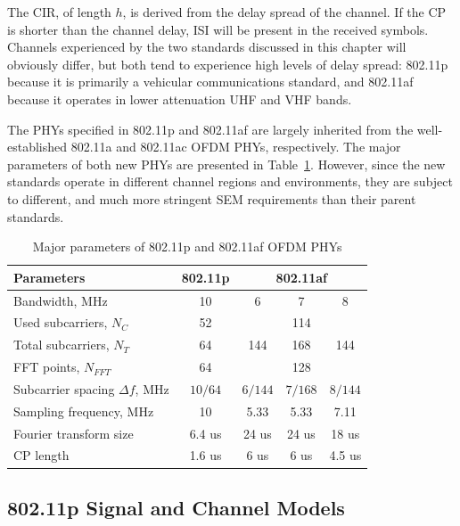 The CIR, of length $h$, is derived from the delay spread of the channel.
If the CP is shorter than the channel delay, ISI will be present in the received symbols.
Channels experienced by the two standards discussed in this chapter will obviously differ, but both tend to experience high levels of delay spread: 802.11p because it is primarily a vehicular communications standard, and 802.11af because it operates in lower attenuation UHF and VHF bands.


The PHYs specified in 802.11p and 802.11af are largely inherited from the well-established 802.11a and 802.11ac OFDM PHYs, respectively.
The major parameters of both new PHYs are presented in Table~\ref{tab:Para}.
However, since the new standards operate in different channel regions and environments, they are subject to different, and much more stringent SEM requirements than their parent standards.
\begin{table}[h]
	\centering
	\caption{ Major parameters of 802.11p and 802.11af OFDM PHYs}
	\label{tab:Para}
	\renewcommand{\arraystretch}{1.2}
	\begin{tabular}{l|c|c|c|c}
		Parameters                      	 		& 802.11p & \multicolumn{3}{c}{802.11af} \\ \hline
		Bandwidth, MHz                  		& 10     & 6    & 7   & 8    \\ \hline
		Used subcarriers, $N_{C}$ 		& 52      & \multicolumn{3}{c}{114}      \\ \hline
		Total subcarriers, $N_{T}$  		& 64      & 144      & 168     & 144     \\ \hline
		FFT points, $N_{FFT}$      		& 64      & \multicolumn{3}{c}{128}      \\ \hline
		Subcarrier spacing $\Delta f$, MHz        	& ${10}/{64}$   & ${6}/{144}$    & ${7}/{168}$   & ${8}/{144}$   \\ \hline
		Sampling frequency, MHz			& 10 & 5.33 & 5.33 & 7.11  \\ \hline
		Fourier transform size         		& 6.4 us  & 24 us    & 24 us   & 18 us   \\ \hline
		CP length                        			& 1.6 us  & 6 us     & 6 us    & 4.5 us
	\end{tabular}
\end{table}

\subsection{802.11p Signal and Channel Models}

